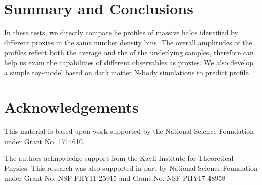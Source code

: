 \documentclass[a4paper,fleqn,usenatbib]{mnras}
\begin{document}


\section{Summary and Conclusions}
    \label{sec:summary}
    

    In these tests, we directly compare he \dsigma{} profiles of massive halos identified 
    by different \mvir{} proxies in the same number density bins. 
    The overall amplitudes of the \dsigma{} profiles reflect both the average \mvir{} and the 
    \sighalo{} of the underlying samples, therefore can help us exam the capabilities of 
    different observables as \mvir{} proxies.
    We also develop a simple toy-model based on dark matter N-body simulations to predict 
    \dsigma{} profile


\section*{Acknowledgements}


  This material is based upon work supported by the National Science Foundation under 
  Grant No. 1714610. 
  
  The authors acknowledge support from the Kavli Institute for Theoretical Physics.
  This research was also supported in part by National Science Foundation under Grant 
  No. NSF PHY11-25915 and Grant No. NSF PHY17-48958
  
\end{document}
